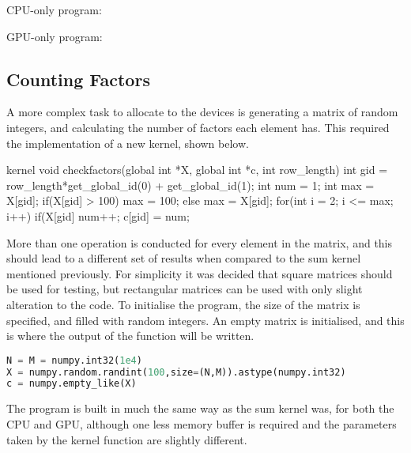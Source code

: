 CPU-only program:

GPU-only program:



\subsection{Counting Factors}
A more complex task to allocate to the devices is generating a matrix of random integers, and calculating the number of factors each element has. This required the implementation of a new kernel, shown below.

\begin{Cpp}
kernel void checkfactors(global int *X, global int *c, int row_length){
  int gid = row_length*get_global_id(0) + get_global_id(1);
  int num = 1;
  int max = X[gid];
  if(X[gid] > 100)
    max = 100;
  else
    max = X[gid];
  for(int i = 2; i <= max; i++){
      if(X[gid]%
          num++;}
  c[gid] = num;}
\end{Cpp}

More than one operation is conducted for every element in the matrix, and this should lead to a different set of results when compared to the sum kernel mentioned previously. For simplicity it was decided that square matrices should be used for testing, but rectangular matrices can be used with only slight alteration to the code. To initialise the program, the size of the matrix is specified, and filled with random integers. An empty matrix is initialised, and this is where the output of the function will be written.

\begin{lstlisting}[language=Python]
N = M = numpy.int32(1e4)
X = numpy.random.randint(100,size=(N,M)).astype(numpy.int32)
c = numpy.empty_like(X)
\end{lstlisting}

The program is built in much the same way as the sum kernel was, for both the CPU and GPU, although one less memory buffer is required and the parameters taken by the kernel function are slightly different.

%
%
%
